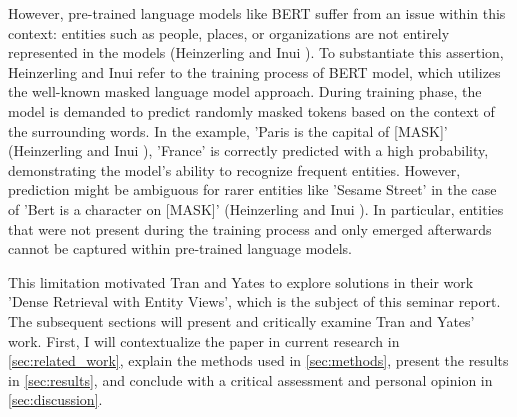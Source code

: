 However, pre-trained language models like BERT suffer from an issue within this context: entities such as people, places, or organizations are not entirely represented in the models (Heinzerling and Inui \cite{limitations}). To substantiate this assertion, Heinzerling and Inui refer to the training process of BERT model, which utilizes the well-known masked language model approach. During training phase, the model is demanded to predict randomly masked tokens based on the context of the surrounding words. In the example, 'Paris is the capital of [MASK]' (Heinzerling and Inui \cite{limitations}), 'France' is correctly predicted with a high probability, demonstrating the model's ability to recognize frequent entities. However, prediction might be ambiguous for rarer entities like 'Sesame Street' in the case of 'Bert is a character on [MASK]' (Heinzerling and Inui \cite{limitations}). In particular, entities that were not present during the training process and only emerged afterwards cannot be captured within pre-trained language models.

This limitation motivated Tran and Yates \cite{tran2022dense} to explore solutions in their work 'Dense Retrieval with Entity Views', which is the subject of this seminar report. The subsequent sections will present and critically examine Tran and Yates' work. First, I will contextualize the paper in current research in \autoref{sec:related_work}, explain the methods used in \autoref{sec:methods}, present the results in \autoref{sec:results}, and conclude with a critical assessment and personal opinion in \autoref{sec:discussion}.


